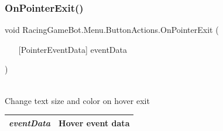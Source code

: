 \subsubsection{\texorpdfstring{OnPointerExit()}{OnPointerExit()}}
{\footnotesize\ttfamily void RacingGameBot.Menu.ButtonActions.OnPointerExit (\begin{itemize}
    \item[] [{PointerEventData}]{ eventData }
\end{itemize}\hspace{0.5cm})}\\
Change text size and color on hover exit \\
\begin{tabular}{|c|c|}
\hline
{\em eventData} & Hover event data\\
\hline
\end{tabular}
